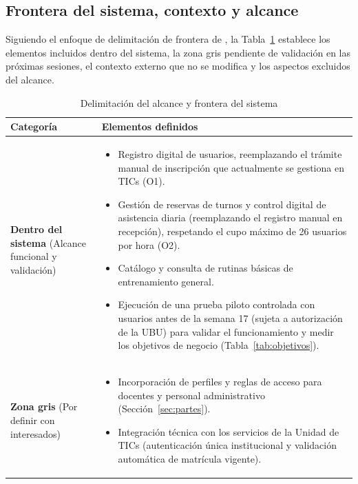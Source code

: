 \subsection{Frontera del sistema, contexto y alcance}
Siguiendo el enfoque de delimitación de frontera de \cite{pohlrupp2015}, la Tabla~\ref{tab:alcance} establece los elementos incluidos dentro del sistema, la zona gris pendiente de validación en las próximas sesiones, el contexto externo que no se modifica y los aspectos excluidos del alcance.

\begin{table}[htbp]
\centering
\small
\caption{Delimitación del alcance y frontera del sistema}
\label{tab:alcance}
\renewcommand{\arraystretch}{1.25}
\begin{tabular}{p{3.6cm} p{10.4cm}}
\hline
\textbf{Categoría} & \textbf{Elementos definidos} \\
\hline
\textbf{Dentro del sistema} \newline (Alcance funcional y validación) &
\begin{itemize}[leftmargin=*, nosep, after=\vspace{2pt}]
    \item Registro digital de usuarios, reemplazando el trámite manual de inscripción que actualmente se gestiona en TICs (O1).
    \item Gestión de reservas de turnos y control digital de asistencia diaria (reemplazando el registro manual en recepción), respetando el cupo máximo de 26 usuarios por hora (O2).
    \item Catálogo y consulta de rutinas básicas de entrenamiento general.
    \item Ejecución de una prueba piloto controlada con usuarios antes de la semana 17 (sujeta a autorización de la UBU) para validar el funcionamiento y medir los objetivos de negocio (Tabla~\ref{tab:objetivos}).
\end{itemize} \\
\hline
\textbf{Zona gris} \newline (Por definir con interesados) &
\begin{itemize}[leftmargin=*, nosep, after=\vspace{2pt}]
    \item Incorporación de perfiles y reglas de acceso para docentes y personal administrativo (Sección~\ref{sec:partes}).
    \item Integración técnica con los servicios de la Unidad de TICs (autenticación única institucional y validación automática de matrícula vigente).

\end{itemize}
\end{tabular}
\end{table}
